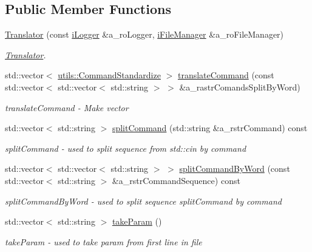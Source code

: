 \subsection*{Public Member Functions}
\begin{DoxyCompactItemize}
\item 
\mbox{\hyperlink{classhelper_1_1_translator_a5a7565a5da4276aba028c587ee212913}{Translator}} (const \mbox{\hyperlink{classi_logger}{i\+Logger}} \&a\+\_\+ro\+Logger, \mbox{\hyperlink{classi_file_manager}{i\+File\+Manager}} \&a\+\_\+ro\+File\+Manager)
\begin{DoxyCompactList}\small\item\em \mbox{\hyperlink{classhelper_1_1_translator}{Translator}}. \end{DoxyCompactList}\item 
std\+::vector$<$ \mbox{\hyperlink{structutils_1_1_command_standardize}{utils\+::\+Command\+Standardize}} $>$ \mbox{\hyperlink{classhelper_1_1_translator_ad34c90b65d84e99b2cbf7188739f459d}{translate\+Command}} (const std\+::vector$<$ std\+::vector$<$ std\+::string $>$ $>$ \&a\+\_\+rastr\+Comands\+Split\+By\+Word)
\begin{DoxyCompactList}\small\item\em translate\+Command -\/ Make vector \end{DoxyCompactList}\item 
std\+::vector$<$ std\+::string $>$ \mbox{\hyperlink{classhelper_1_1_translator_acc87c03c71d988bb0f6e95e1bff839c8}{split\+Command}} (std\+::string \&a\+\_\+rstr\+Command) const
\begin{DoxyCompactList}\small\item\em split\+Command -\/ used to split sequence from std\+::cin by command \end{DoxyCompactList}\item 
std\+::vector$<$ std\+::vector$<$ std\+::string $>$ $>$ \mbox{\hyperlink{classhelper_1_1_translator_a1c4dfb9ff8a0a6d9453d7670a551fb61}{split\+Command\+By\+Word}} (const std\+::vector$<$ std\+::string $>$ \&a\+\_\+rstr\+Command\+Sequence) const
\begin{DoxyCompactList}\small\item\em split\+Command\+By\+Word -\/ used to split sequence split\+Command by command \end{DoxyCompactList}\item 
std\+::vector$<$ std\+::string $>$ \mbox{\hyperlink{classhelper_1_1_translator_a10a9763f9cdb15732b6dc9f0bca7cc7b}{take\+Param}} ()
\begin{DoxyCompactList}\small\item\em take\+Param -\/ used to take param from first line in file \end{DoxyCompactList}\item 

\end{DoxyCompactItemize}
